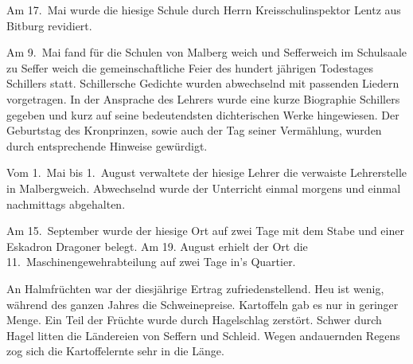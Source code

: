 

\pstart
Am 17.\ Mai wurde die hiesige Schule durch\ob
Herrn Kreisschulinspektor Lentz aus Bitburg\ob
revidiert.

\pend
{}
\pstart

Am 9.\ Mai fand für die Schulen von Malberg\ohb
weich und Sefferweich im Schulsaale zu Seffer\ohb
weich die gemeinschaftliche Feier des hundert\ohb
jährigen Todestages Schillers statt. Schillersche\ob
Gedichte wurden abwechselnd mit passenden\ob
Liedern vorgetragen. In der Ansprache des\ob
Lehrers wurde eine kurze Biographie Schillers\ob
gegeben und kurz auf seine bedeutendsten\ob
dichterischen Werke hingewiesen. Der Geburtstag\ob
des Kronprinzen, sowie auch der Tag seiner\ob
Vermählung, wurden durch entsprechende\ob
Hinweise gewürdigt.

\pend
{}
\pstart

Vom 1.\ Mai bis 1.\ August verwaltete der hiesige\ob
Lehrer die verwaiste Lehrerstelle in Malbergweich.\ob
Abwechselnd wurde der Unterricht einmal morgens\ob
und einmal nachmittags abgehalten.

\pend
{}
\pstart

Am 15.\ September wurde der hiesige Ort auf\ob
zwei Tage mit dem Stabe und einer Eskadron\ob
Dragoner belegt. Am 19.\unsicher{} August erhielt der\ob
Ort die 11.\ Maschinengewehrabteilung\unsicher{} auf zwei\ob
Tage in's Quartier.

\pend
{}
\pstart

An Halmfrüchten war der diesjährige Ertrag\ob
zufriedenstellend. Heu ist wenig, während des\ob
ganzen Jahres die Schweinepreise. Kartoffeln\ob
gab es nur in geringer Menge. Ein Teil der\ob
Früchte wurde durch Hagelschlag zerstört.\ob
Schwer durch Hagel litten die Ländereien von\ob
Seffern und Schleid. Wegen andauernden Regens\ob
zog sich die Kartoffelernte sehr in die Länge.
\pend
